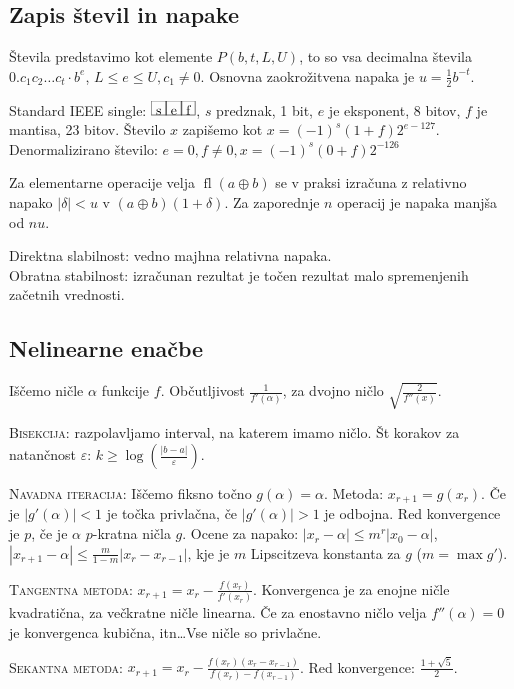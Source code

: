 \documentclass[a4paper,10pt]{article}
\title{\mytitle}
\author{Jure Slak}
\date{\today}
\theoremstyle{definition}
\newcommand{\mybox}[1]{\frame{\rule{0pt}{10pt}\ #1\ }}
\begin{document}
\subsection*{Zapis števil in napake}
Števila predstavimo kot elemente $P(b, t, L, U)$, to so vsa decimalna števila
$0.c_1c_2\ldots c_t \cdot b^e$, $L \leq e \leq U, c_1 \neq 0$. Osnovna zaokrožitvena
 napaka je $u = \frac12b^{-t}$.

Standard IEEE single: $\mybox{s}\mybox{e}\mybox{f}$, $s$ predznak, 1 bit, $e$ je eksponent,
8 bitov, $f$ je mantisa, 23 bitov. Število $x$ zapišemo kot $x = (-1)^s(1+f)2^{e-127}$.
Denormalizirano število: $e = 0, f \neq 0, x = (-1)^s(0+f)2^{-126}$

Za elementarne operacije velja $\operatorname{fl}(a \oplus b)$ se v praksi izračuna
z relativno napako $|\delta| < u$ v $(a \oplus b)(1+\delta)$. Za zaporednje $n$ operacij 
je napaka manjša od $nu$. 

Direktna slabilnost: vedno majhna relativna napaka. \\
Obratna stabilnost: izračunan rezultat je točen rezultat malo spremenjenih začetnih vrednosti.

\subsection*{Nelinearne enačbe}
Iščemo ničle $\alpha$ funkcije $f$. Občutljivost $\frac{1}{f'(\alpha)}$, za
dvojno ničlo $\sqrt{\frac{2}{f''(x)}}$.

\textsc{Bisekcija:} razpolavljamo interval, na katerem imamo ničlo. Št korakov za
natančnost $\varepsilon$: $k \geq \log\left(\frac{|b-a|}{\varepsilon}\right)$.

\textsc{Navadna iteracija:} Iščemo fiksno točno $g(\alpha) = \alpha$. Metoda: $x_{r+1} =
g(x_r)$. Če je $|g'(\alpha)| < 1$ je točka privlačna, če $|g'(\alpha)| > 1$ je
odbojna. Red konvergence je $p$, če je $\alpha$ $p$-kratna ničla $g$. Ocene za napako:
$|x_r - \alpha| \leq m^r|x_0 - \alpha|$, $|x_{r+1} - \alpha|  \leq \frac{m}{1-m} |x_r - x_{r-1}|$, kje je $m$ Lipscitzeva
konstanta za $g$ ($m = \max g'$).

\textsc{Tangentna metoda:} $x_{r+1} = x_r - \frac{f(x_r)}{f'(x_r)}$. Konvergenca je za
enojne ničle kvadratična, za večkratne ničle linearna. Če za enostavno ničlo
velja $f''(\alpha) = 0$ je konvergenca kubična, itn\dots Vse ničle so privlačne.

\textsc{Sekantna metoda:} $x_{r+1} = x_r - \frac{f(x_r)(x_r - x_{r-1})}{f(x_r) -
f(x_{r-1})}$. Red konvergence: $\frac{1+\sqrt{5}}{2}$.
\end{document}
